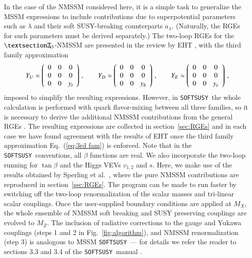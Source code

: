 \documentclass[final,3p,times]{elsarticle}
\def\SOFTSUSY{{\tt SOFTSUSY}}
\newcommand{\Zv}{\,\mathbf{\backslash}\mkern-11.0mu{\mathbb{Z}}_{3}} %
\begin{document}
In the case of the NMSSM considered here, it is a simple task to generalize the 
MSSM expressions \cite{MV94} to include contributions due to superpotential 
parameters such as $\lambda$ and their soft SUSY-breaking counterparts 
$a_\lambda$.  (Naturally, the RGEs for such parameters must be derived 
separately.)  The two-loop RGEs for the $§\Zv$-NMSSM are presented in the review by EHT \cite{Ellwanger:2009dp}, with  
the third family approximation
%
\begin{equation}
Y_U \approx \left(\begin{array}{c c c} 
0 & 0 & 0 \\
0 & 0 & 0 \\
0 & 0 & y_t 
\end{array}\right) \,, \qquad
%
Y_D \approx \left(\begin{array}{c c c} 
0 & 0 & 0 \\
0 & 0 & 0 \\
0 & 0 & y_b 
\end{array}\right) \,, \qquad
%
Y_E \approx \left(\begin{array}{c c c} 
0 & 0 & 0 \\
0 & 0 & 0 \\
0 & 0 & y_e 
\end{array}\right)\,,
\label{eq:3rd fam} 
\end{equation}
%
imposed to simplify the resulting expressions.
However, in \SOFTSUSY~the whole calculation is performed with quark 
flavor-mixing between all three families, so it is necessary to derive the 
additional NMSSM contributions from the general RGEs \cite{MV94,Yam94}.  The 
resulting expressions are collected in section~\ref{sec:RGEs} and in each case we have 
found agreement with the results of EHT \cite{Ellwanger:2009dp} once the third 
family approximation Eq.~(\ref{eq:3rd fam}) is enforced.  Note that in the 
\SOFTSUSY~conventions, all $\beta$ functions are real.
We also incorporate the two-loop running for $\tan\beta$ and the Higgs VEVs  
$v_{1,2}$ and $s$.  Here, we make use of the results obtained by 
Sperling et al.\ \cite{Sper13,Sper13-2}, where the pure   NMSSM contributions 
are reproduced in section~\ref{sec:RGEs}.
The program can be made to run faster by switching off the two-loop
 renormalization of the scalar masses and tri-linear scalar couplings.
Once the user-supplied boundary conditions are applied at $M_X$, the whole 
ensemble of NMSSM soft breaking and SUSY preserving couplings are evolved to 
$M_Z$. The inclusion of radiative corrections to the gauge and Yukawa couplings 
(steps 1 and 2 in Fig.~\ref{fig:algorithm}), and NMSSM renormalization (step 3)
 is analogous to MSSM \SOFTSUSY~--- for details we refer the reader to sections
3.3 and 3.4 of the \SOFTSUSY~manual \cite{Allanach:2001kg}.
\end{document}
